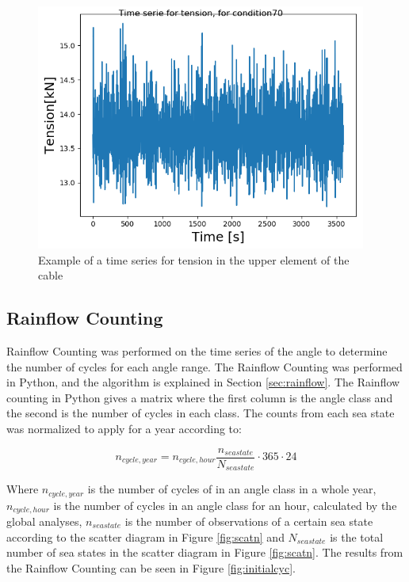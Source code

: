 \begin{figure}[H]
\centering
\includegraphics[scale=0.8]{figures/tensex}
\caption[Example of a time series for tension in the upper element of the cable  ]{Example of a time series for tension in the upper element of the cable}
 \label{fig:tensex}
\end{figure}

\subsection{Rainflow Counting}
 Rainflow Counting was performed on the time series of the angle to determine the number of cycles for each angle range. The Rainflow Counting was performed in Python, and the algorithm is explained in Section \ref{sec:rainflow}. The Rainflow counting in Python gives a matrix where the first column is the angle class and the second is the number of cycles in each class. The counts from each sea state was normalized to apply for a year according to:

\begin{equation}
    n_{cycle,year}=n_{cycle,hour} \frac{n_{seastate}}{N_{seastate}} \cdot 365 \cdot 24 
\end{equation}

\noindent Where $n_{cycle,year}$ is the number of cycles of in an angle class in a whole year, $n_{cycle,hour}$ is the number of cycles in an angle class for an hour, calculated by the global analyses, $n_{seastate}$ is the number of observations of a certain sea state according to the scatter diagram in Figure \ref{fig:scatn} and $N_{seastate}$ is the total number of sea states in the scatter diagram in Figure \ref{fig:scatn}.\newline
\newline 
\noindent The results from the Rainflow Counting can be seen in Figure \ref{fig:initialcyc}.  

